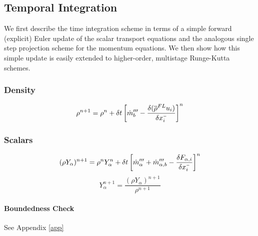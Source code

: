 \documentclass[11pt]{article}
\begin{document}


\subsection{Temporal Integration}

We first describe the time integration scheme in terms of a simple forward (explicit) Euler update of the scalar transport equations and the analogous single step projection scheme for the momentum equations.  We then show how this simple update is easily extended to higher-order, multistage Runge-Kutta schemes.

\subsubsection{Density}

\begin{equation}
\label{eqn_densityupdate}
\rho^{n+1} = \rho^n + \delta t \left[\dot{m}_b^{\prime\prime\prime} - \frac{\delta (\overline{\rho}^{FL} u_i)}{\delta x_i^{\scriptscriptstyle -}} \right]^n
\end{equation}

\subsubsection{Scalars}

\begin{equation}
\label{eqn_densityupdate}
(\rho Y_\alpha)^{n+1} = \rho^n Y_\alpha^n + \delta t \left[\dot{m}_\alpha^{\prime\prime\prime} + \dot{m}_{\alpha,b}^{\prime\prime\prime} - \frac{\delta F_{\alpha,i}}{\delta x_i^{\scriptscriptstyle -}} \right]^n
\end{equation}
\begin{equation}
Y_\alpha^{n+1} = \frac{(\rho Y_\alpha)^{n+1}}{\rho^{n+1}}
\end{equation}

\paragraph{Boundedness Check} See Appendix \ref{app}
\end{document}
